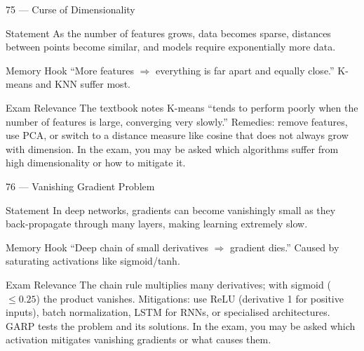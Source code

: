 \documentclass[aspectratio=169,8pt]{beamer}
\begin{document}
	\begin{frame}{75 --- Curse of Dimensionality}
		\begin{block}{Statement}
			As the number of features grows, data becomes sparse, distances between points become similar, and models require exponentially more data.
		\end{block}
		\begin{block}{Memory Hook}
			``More features $\Rightarrow$ everything is far apart and equally close.'' K-means and KNN suffer most.
		\end{block}
		\begin{block}{Exam Relevance}
			The textbook notes K-means ``tends to perform poorly when the number of features is large, converging very slowly.'' Remedies: remove features, use PCA, or switch to a distance measure like cosine that does not always grow with dimension. In the exam, you may be asked which algorithms suffer from high dimensionality or how to mitigate it.
		\end{block}
	\end{frame}
	
	\begin{frame}{76 --- Vanishing Gradient Problem}
		\begin{block}{Statement}
			In deep networks, gradients can become vanishingly small as they back-propagate through many layers, making learning extremely slow.
		\end{block}
		\begin{block}{Memory Hook}
			``Deep chain of small derivatives $\Rightarrow$ gradient dies.'' Caused by saturating activations like sigmoid/tanh.
		\end{block}
		\begin{block}{Exam Relevance}
			The chain rule multiplies many derivatives; with sigmoid ($\leq 0.25$) the product vanishes. Mitigations: use ReLU (derivative 1 for positive inputs), batch normalization, LSTM for RNNs, or specialised architectures. GARP tests the problem and its solutions. In the exam, you may be asked which activation mitigates vanishing gradients or what causes them.
		\end{block}
	\end{frame}
	
\end{document}
